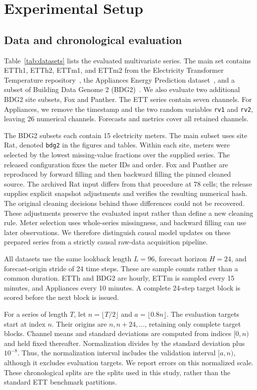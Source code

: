 \section{Experimental Setup}
\label{sec:experimental_setup}

\subsection{Data and chronological evaluation}
Table~\ref{tab:datasets} lists the evaluated multivariate series. The main set contains ETTh1, ETTh2, ETTm1, and ETTm2 from the Electricity Transformer Temperature repository~\cite{ettdata}, the Appliances Energy Prediction dataset~\cite{appliancesdata}, and a subset of Building Data Genome 2 (BDG2)~\cite{bdg2data}. We also evaluate two additional BDG2 site subsets, Fox and Panther. The ETT series contain seven channels. For Appliances, we remove the timestamp and the two random variables \texttt{rv1} and \texttt{rv2}, leaving 26 numerical channels. Forecasts and metrics cover all retained channels.

The BDG2 subsets each contain 15 electricity meters. The main subset uses site Rat, denoted \texttt{bdg2} in the figures and tables. Within each site, meters were selected by the lowest missing-value fractions over the supplied series. The released configuration fixes the meter IDs and order. Fox and Panther are reproduced by forward filling and then backward filling the pinned cleaned source. The archived Rat input differs from that procedure at 78 cells; the release supplies explicit snapshot adjustments and verifies the resulting numerical hash. The original cleaning decisions behind those differences could not be recovered. These adjustments preserve the evaluated input rather than define a new cleaning rule. Meter selection uses whole-series missingness, and backward filling can use later observations. We therefore distinguish causal model updates on these prepared series from a strictly causal raw-data acquisition pipeline.

All datasets use the same lookback length $L=96$, forecast horizon $H=24$, and forecast-origin stride of 24 time steps. These are sample counts rather than a common duration. ETTh and BDG2 are hourly, ETTm is sampled every 15 minutes, and Appliances every 10 minutes. A complete 24-step target block is scored before the next block is issued.

For a series of length $T$, let $n=\lfloor T/2\rfloor$ and $a=\lfloor0.8n\rfloor$. The evaluation targets start at index $n$. Their origins are $n,n+24,\ldots$, retaining only complete target blocks. Channel means and standard deviations are computed from indices $[0,n)$ and held fixed thereafter. Normalization divides by the standard deviation plus $10^{-8}$. Thus, the normalization interval includes the validation interval $[a,n)$, although it excludes evaluation targets. We report errors on this normalized scale. These chronological splits are the splits used in this study, rather than the standard ETT benchmark partitions.

